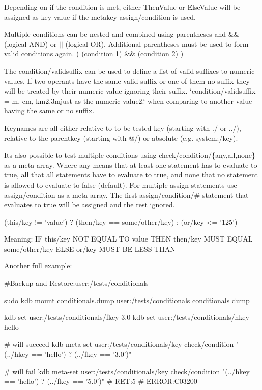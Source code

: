 Depending on if the condition is met, either \textquotesingle{}Then\+Value\textquotesingle{} or \textquotesingle{}Else\+Value\textquotesingle{} will be assigned as key value if the metakey {\ttfamily assign/condition} is used.

Multiple conditions can be nested and combined using parentheses and {\ttfamily \&\&} (logical A\+ND) or {\ttfamily $\vert$$\vert$} (logical OR). Additional parentheses must be used to form valid conditions again. {\ttfamily (} {\ttfamily (condition 1) \&\& (condition 2)} {\ttfamily )}

The {\ttfamily condition/validsuffix} can be used to define a list of valid suffixes to numeric values. If two operants have the same valid suffix or one of them no suffix they will be treated by their numeric value ignoring their suffix. `condition/validsuffix = \textquotesingle{}m\textquotesingle{}, \textquotesingle{}cm\textquotesingle{}, \textquotesingle{}km2.\+3m{\ttfamily just as the numeric value}2.` when comparing to another value having the same or no suffix.

Keynames are all either relative to to-\/be-\/tested key (starting with {\ttfamily ./} or {\ttfamily ../}), relative to the parentkey (starting with {\ttfamily @/}) or absolute (e.\+g. {\ttfamily system\+:/key}).

It\textquotesingle{}s also possible to test multiple conditions using {\ttfamily check/condition/\{any,all,none\}} as a meta array. Where {\ttfamily any} means that at least one statement has to evaluate to true, {\ttfamily all} that all statements have to evaluate to true, and {\ttfamily none} that no statement is allowed to evaluate to false (default). For multiple assign statements use {\ttfamily assign/condition} as a meta array. The first {\ttfamily assign/condition/\#} statement that evaluates to true will be assigned and the rest ignored.


\begin{DoxyCode}
(this/key  != 'value') ? (then/key == some/other/key) : (or/key <= '125')
\end{DoxyCode}


Meaning\+: IF {\ttfamily this/key} N\+OT E\+Q\+U\+AL TO {\ttfamily \textquotesingle{}value\textquotesingle{}} T\+H\+EN {\ttfamily then/key} M\+U\+ST E\+Q\+U\+AL {\ttfamily some/other/key} E\+L\+SE {\ttfamily or/key} M\+U\+ST BE L\+E\+SS T\+H\+AN {}

Another full example\+:


\begin{DoxyCode}
#Backup-and-Restore:user:/tests/conditionals

sudo kdb mount conditionals.dump user:/tests/conditionals conditionals dump

kdb set user:/tests/conditionals/fkey 3.0
kdb set user:/tests/conditionals/hkey hello

# will succeed
kdb meta-set user:/tests/conditionals/key check/condition "(../hkey == 'hello') ? (../fkey == '3.0')"

# will fail
kdb meta-set user:/tests/conditionals/key check/condition "(../hkey == 'hello') ? (../fkey == '5.0')"
# RET:5
# ERROR:C03200
\end{DoxyCode}


